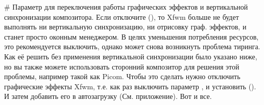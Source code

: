 \documentclass[letterpaper,10pt,russian,openany]{sphinxmanual}
\begin{document}
\sphinxAtStartPar
{} \# Параметр для переключения работы графических эффектов и вертикальной синхронизации композитора.
Если отключите (), то Xfwm больше не будет выполнять ни вертикальную синхронизацию, ни отрисовку граф. эффектов, и станет просто оконным менеджером.
В целях уменьшения потребления ресурсов, это рекомендуется выключить, однако может снова возникнуть проблема тиринга.
Как её решить без применения вертикальной синхронизации было указано ниже,
но вы также можете использовать сторонний композитор для решения этой проблемы, например такой как Picom.
Чтобы это сделать нужно отключить графические эффекты Xfwm, т.е. как раз выключить параметр ,
и установить  ().
И затем добавить его в автозагрузку (См. приложение). Вот и все.

\noindent{}
\end{document}
